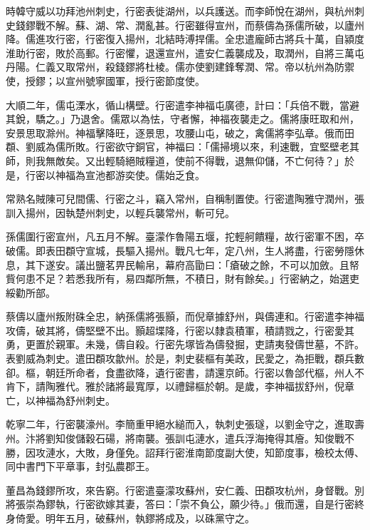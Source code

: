 \begin{pinyinscope}
 時韓守威以功拜池州刺史，行密表徙湖州，以兵護送。而李師悅在湖州，與杭州刺史錢鏐戰不解。蘇、湖、常、潤亂甚。行密雖得宣州，而蔡儔為孫儒所破，以廬州降。儒進攻行密，行密復入揚州，北結時溥捍儒。全忠遣龐師古將兵十萬，自潁度淮助行密，敗於高郵。行密懼，退還宣州，遣安仁義襲成及，取潤州，自將三萬屯丹陽。仁義又取常州，殺錢鏐將杜棱。儒亦使劉建鋒奪潤、常。帝以杭州為防禦使，授鏐；以宣州號寧國軍，授行密節度使。



 大順二年，儒屯溧水，循山構壁。行密遣李神福屯廣德，計曰：「兵倍不戰，當避其銳，驕之。」乃退舍。儒眾以為怯，守者懈，神福夜襲走之。儒將康旺取和州，安景思取滁州。神福擊降旺，逐景思，攻腰山屯，破之，禽儒將李弘章。俄而田頵、劉威為儒所敗。行密欲守銅官，神福曰：「儒掃境以來，利速戰，宜堅壁老其師，則我無敵矣。又出輕騎絕賊糧道，使前不得戰，退無仰儲，不亡何待？」於是，行密以神福為宣池都游奕使。儒始乏食。



 常熟名賊陳可兒間儒、行密之斗，竊入常州，自稱制置使。行密遣陶雅守潤州，張訓入揚州，因執楚州刺史，以輕兵襲常州，斬可兒。



 孫儒圍行密宣州，凡五月不解。臺濛作魯陽五堰，拕輕舸饋糧，故行密軍不困，卒破儒。即表田頵守宣城，長驅入揚州。戰凡七年，定八州，生人將盡，行密勞隱休息，其下遂安。議出鹽茗畀民輸帛，幕府高勖曰：「瘡破之餘，不可以加斂。且帑貲何患不足？若悉我所有，易四鄰所無，不積日，財有餘矣。」行密納之，始選吏綏勸所部。



 蔡儔以廬州叛附硃全忠，納孫儒將張顥，而倪章據舒州，與儔連和。行密遣李神福攻儔，破其將，儔堅壁不出。顥超堞降，行密以隸袁積軍，積請戮之，行密愛其勇，更置於親軍。未幾，儔自殺。行密先塚皆為儔發掘，吏請夷發儔世墓，不許。表劉威為刺史。遣田頵攻歙州。於是，刺史裴樞有美政，民愛之，為拒戰，頵兵數卻。樞，朝廷所命者，食盡欲降，遺行密書，請還京師。行密以魯郃代樞，州人不肯下，請陶雅代。雅於諸將最寬厚，以禮歸樞於朝。是歲，李神福拔舒州，倪章亡，以神福為舒州刺史。



 乾寧二年，行密襲濠州。李簡重甲絕水縋而入，執刺史張璲，以劉金守之，進取壽州。汴將劉知俊儲穀石碭，將南襲。張訓屯漣水，遣兵浮海掩得其廥。知俊戰不勝，因攻漣水，大敗，身僅免。詔拜行密淮南節度副大使，知節度事，檢校太傅、同中書門下平章事，封弘農郡王。



 董昌為錢鏐所攻，來告窮。行密遣臺濛攻蘇州，安仁義、田頵攻杭州，身督戰。別將張崇為鏐執，行密欲嫁其妻，答曰：「崇不負公，願少待。」俄而還，自是行密終身倚愛。明年五月，破蘇州，執鏐將成及，以硃黨守之。




\end{pinyinscope}
